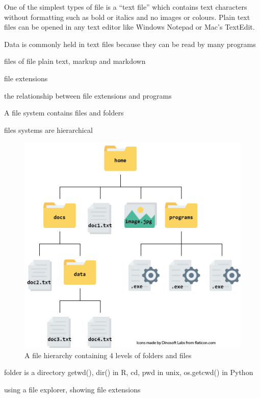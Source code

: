 \documentclass[
  letterpaper,
  DIV=11,
  numbers=noendperiod]{scrreprt}
\begin{document}
One of the simplest types of file is a ``text file'' which contains text
characters without formatting such as bold or italics and no images or
colours. Plain text files can be opened in any text editor like Windows
Notepad or Mac's TextEdit.

Data is commonly held in text files because they can be read by many
programs

files of file plain text, markup and markdown

file extensions

the relationship between file extensions and programs

A file system contains files and folders

files systems are hierarchical

\begin{figure}

{\centering \includegraphics{images/file-system.png}

}

\caption{A file hierarchy containing 4 levels of folders and files}

\end{figure}

folder is a directory getwd(), dir() in R, cd, pwd in unix, os.getcwd()
in Python

using a file explorer, showing file extensions
\end{document}
